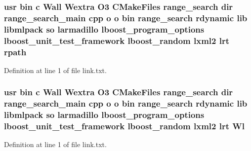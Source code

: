 \subsubsection[{rpath}]{\setlength{\rightskip}{0pt plus 5cm}usr bin c Wall Wextra O3 C\-Make\-Files range\-\_\-search dir range\-\_\-search\-\_\-main cpp o o bin range\-\_\-search rdynamic lib libmlpack so larmadillo lboost\-\_\-program\-\_\-options lboost\-\_\-unit\-\_\-test\-\_\-framework lboost\-\_\-random lxml2 lrt rpath}\label{methods_2range__search_2CMakeFiles_2range__search_8dir_2link_8txt_ae8bd737ba24c4001d2367d1743e51ad6}


Definition at line 1 of file link.\-txt.

\subsubsection[{Wl}]{\setlength{\rightskip}{0pt plus 5cm}usr bin c Wall Wextra O3 C\-Make\-Files range\-\_\-search dir range\-\_\-search\-\_\-main cpp o o bin range\-\_\-search rdynamic lib libmlpack so larmadillo lboost\-\_\-program\-\_\-options lboost\-\_\-unit\-\_\-test\-\_\-framework lboost\-\_\-random lxml2 lrt Wl}\label{methods_2range__search_2CMakeFiles_2range__search_8dir_2link_8txt_a39d973b310e41cb75c2bda2e74f39a54}


Definition at line 1 of file link.\-txt.

